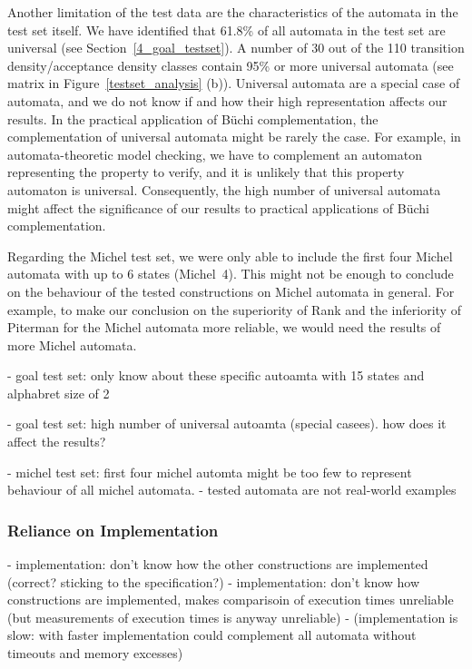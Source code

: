 Another limitation of the test data are the characteristics of the automata in the \goal{} test set itself. We have identified that 61.8\% of all automata in the \goal{} test set are universal (see Section~\ref{4_goal_testset}). A number of 30 out of the 110 transition density/acceptance density classes contain 95\% or more universal automata (see matrix in Figure~\ref{testset_analysis} (b)). Universal automata are a special case of automata, and we do not know if and how their high representation affects our results. In the practical application of Büchi complementation, the complementation of universal automata might be rarely the case. For example, in automata-theoretic model checking, we have to complement an automaton representing the property to verify, and it is unlikely that this property automaton is universal. Consequently, the high number of universal automata might affect the significance of our results to practical applications of Büchi complementation.

Regarding the Michel test set, we were only able to include the first four Michel automata with up to 6 states (Michel~4). This might not be enough to conclude on the behaviour of the tested constructions on Michel automata in general. For example, to make our conclusion on the superiority of Rank and the inferiority of Piterman for the Michel automata more reliable, we would need the results of more Michel automata.






- goal test set: only know about these specific autoamta with 15 states and alphabret size of 2


- goal test set: high number of universal autoamta (special casees). how does it affect the results?


- michel test set: first four michel automta might be too few to represent behaviour of all michel automata. 
- tested automata are not real-world examples


\subsubsection{Reliance on Implementation}
- implementation: don't know how the other constructions are implemented (correct? sticking to the specification?)
- implementation: don't know how constructions are implemented, makes comparisoin of execution times unreliable (but measurements of execution times is anyway unreliable)
- (implementation is slow: with faster implementation could complement all automata without timeouts and memory excesses)

